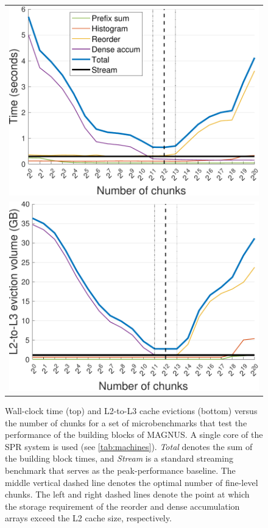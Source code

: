 \begin{figure}[t]
\centering
\begin{tabular}{c}
\includegraphics[width=\figwidth]{figs/spr_buildingBlocks_varyChunks_scale29_time.pdf} \\
\includegraphics[width=\figwidth]{figs/spr_buildingBlocks_varyChunks_scale29_L3Evict.pdf}
\end{tabular}
\caption{Wall-clock time (top) and L2-to-L3 cache evictions (bottom) versus the number of chunks for a set of microbenchmarks that test the performance of the building blocks of MAGNUS.
A single core of the SPR system is used (see \autoref{tab:machines}). \textit{Total} denotes the sum of the building block times, and \textit{Stream} is a standard streaming benchmark that serves as the peak-performance baseline. The middle vertical dashed line denotes the optimal number of fine-level chunks.
The left and right dashed lines denote the point at which the storage requirement of the reorder and dense accumulation arrays exceed the L2 cache size, respectively.}
\label{fig:building_blocks_varyChunks}
\end{figure}

